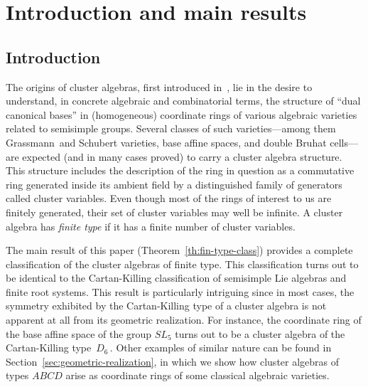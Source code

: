 \documentclass[letterpaper]{amsart}
\numberwithin{equation}{section}
\theoremstyle{definition}
\begin{document}
\section{Introduction and main results} 
\label{sec:intro-main-results} 
 
\subsection{Introduction} 
 
The origins of cluster algebras, 
first introduced 
in~\cite{fz-clust1}, 
lie in the desire to understand, 
in concrete algebraic and combinatorial terms, the structure of 
``dual canonical bases'' in (homogeneous) 
coordinate rings of various algebraic varieties 
related to semisimple groups. 
Several classes of such varieties---among them Grassmann~and Schubert 
varieties, base affine spaces, 
and double Bruhat cells---are expected (and in many cases proved) to 
carry a cluster algebra structure. 
This structure includes the description of the ring in question 
as a commutative ring generated inside its ambient field by a 
distinguished family of generators called cluster variables. 
Even though most of the rings of interest to us are finitely 
generated, their set of cluster variables may well be infinite. 
A cluster algebra has \emph{finite type} if it has 
a finite number of cluster variables. 
 
The main result of this paper (Theorem~\ref{th:fin-type-class}) 
provides a complete classification of the cluster algebras of finite 
type. 
This classification turns out to be identical 
to the Cartan-Killing 
classification of semisimple Lie algebras and finite root systems. 
% 
% 
This result is particularly intriguing since 
in most cases, the symmetry exhibited by the Cartan-Killing type 
of a cluster algebra is not apparent at all from its geometric 
realization. 
For instance, the coordinate ring of the base affine space of the 
group $SL_5$ turns out to be a cluster algebra of the 
Cartan-Killing type~$D_6\,$. 
Other examples of similar nature can be found in 
Section~\ref{sec:geometric-realization}, 
in which we show how cluster algebras of types $ABCD$ arise as 
coordinate rings of some classical %
algebraic varieties. 
 
\end{document}
